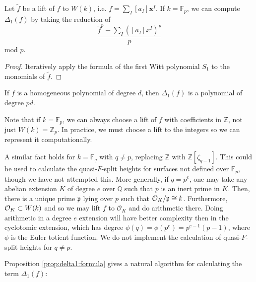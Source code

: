 \begin{prop}
	\label{prop:delta1:formula}
	Let \(\tilde{f}\) be a lift of \(f\) to \(W(k)\),
	i.e.
	\(f = \sum_{I}^{} [a_{I}] \mathbf{x}^{I}\).
	If \(k = \mathbb{F}_{p}\),
	we can compute \(\Delta_{1}(f)\) by 
	taking the reduction of
	\[
		\frac{\tilde{f}^{p} - \sum_{I}^{} ([a_{I}]x^{I})^{p} }{p}
	\] 
	mod \(p\).
\end{prop}

\begin{proof}
	Iteratively apply the formula of the first
	Witt polynomial \(S_{1}\) 
	to the monomials of \(\tilde{f}\).
\end{proof}

\begin{rmk}
	If \(f\) is a homogeneous polynomial of degree \(d\), 
	then \(\Delta_{1}(f)\) is a polynomial of degree \(pd\).
\end{rmk}

\begin{rmk}
    \label{rmk:lift:roi}
    Note that if \(k = \mathbb{F}_{p}\), we can always choose a lift
    of \(f\) with coefficients in \(\mathbb{Z}\), 
    not just \(W(k) = \mathbb{Z}_{p}\).
    In practice, we must choose a lift to the integers
    so we can represent it computationally.

    A similar fact holds for \(k = \mathbb{F}_{q}\) with 
    \(q \neq p\), replacing \(\mathbb{Z}\) with
    \(\mathbb{Z}[\zeta_{q-1}]\).
    This could be used to calculate the quasi-\(F\)-split 
    heights for surfaces not defined over \(\mathbb{F}_{p}\),
    though we have not attempted this.
    More generally, if \(q = p^{e}\), one may take
    any abelian extension \(K\) of degree \(e\) over \(\mathbb{Q}\) such that
    \(p\) is an inert prime in \(K\).
    Then, there is a unique prime \(\mathfrak{p}\) lying over \(p\) 
    such that \(\mathcal{O}_{K} / \mathfrak{p} \cong k\).
    Furthermore, \(\mathcal{O}_{K} \subset W(k)\)
    and so we may lift \(f\) to \(\mathcal{O}_{K}\) 
    and do arithmetic there. 
    Doing arithmetic in a degree \(e\) extension will have
    better complexity then in the cyclotomic extension, which
    has degree \(\phi(q) = \phi(p^{e}) = p^{e-1}(p-1)\), where
    \(\phi\) is the Euler totient function.
    We do not implement the calculation of quasi-\(F\)-split
    heights for \(q \neq p\).
\end{rmk}

Proposition \ref{prop:delta1:formula} gives a natural algorithm
for calculating the term \(\Delta_{1}(f)\): 

